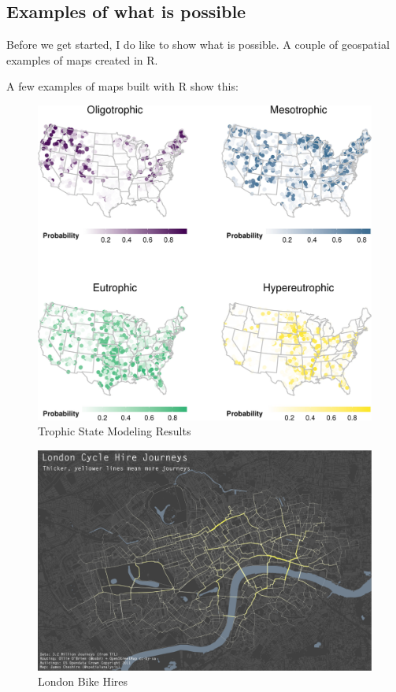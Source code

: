 \documentclass[]{article}
\begin{document}
\hypertarget{examples-of-what-is-possible}{%
\subsection{Examples of what is
possible}\label{examples-of-what-is-possible}}

Before we get started, I do like to show what is possible. A couple of
geospatial examples of maps created in R.

A few examples of maps built with R show this:

\begin{figure}
\centering
\includegraphics{figures/ecs21321-fig-0011-m.jpg}
\caption{Trophic State Modeling Results}
\end{figure}

\begin{figure}
\centering
\includegraphics{figures/bike_ggplot.png}
\caption{London Bike Hires}
\end{figure}
\end{document}
